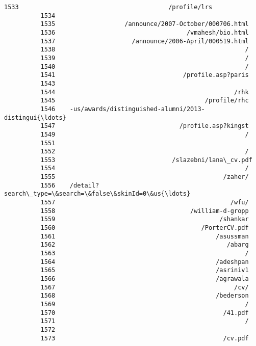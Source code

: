 \documentclass[11pt]{article}
\begin{document}
\begin{Verbatim}[commandchars=\\\{\}]
          1533                                         /profile/lrs
          1534                                                     
          1535                   /announce/2007-October/000706.html
          1536                                    /vmahesh/bio.html
          1537                     /announce/2006-April/000519.html
          1538                                                    /
          1539                                                    /
          1540                                                    /
          1541                                   /profile.asp?paris
          1543                                                     
          1544                                                 /rhk
          1545                                         /profile/rhc
          1546    -us/awards/distinguished-alumni/2013-distingui{\ldots}
          1547                                  /profile.asp?kingst
          1549                                                    /
          1551                                                     
          1552                                                    /
          1553                                /slazebni/lana\_cv.pdf
          1554                                                    /
          1555                                              /zaher/
          1556    /detail?search\_type=\&search=\&false\&skinId=0\&us{\ldots}
          1557                                                /wfu/
          1558                                     /william-d-gropp
          1559                                             /shankar
          1560                                        /PorterCV.pdf
          1561                                            /asussman
          1562                                               /abarg
          1563                                                    /
          1564                                            /adeshpan
          1565                                            /asriniv1
          1566                                            /agrawala
          1567                                                 /cv/
          1568                                            /bederson
          1569                                                    /
          1570                                              /41.pdf
          1571                                                    /
          1572                                                     
          1573                                              /cv.pdf

\end{Verbatim}
\end{document}
